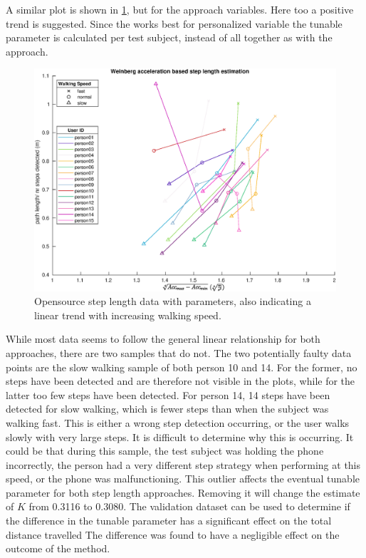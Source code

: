 A similar plot is shown in \cref{fig:step_length_weinberg}, but for the \citet{Weinberg2002} approach variables. Here too a positive trend is suggested. Since the \citet{Weinberg2002} works best for personalized variable the tunable parameter is calculated per test subject, instead of all together as with the \citet{Tian2016} approach. 

\begin{figure}[H]
	\centering
	\includegraphics[width=0.8\linewidth]{images/20201113_1639_weinberg}
	\caption{Opensource step length data with \citet{Weinberg2002} parameters, also indicating a linear trend with increasing walking speed.}
	\label{fig:step_length_weinberg}
\end{figure}

While most data seems to follow the general linear relationship for both approaches, there are two samples that do not. The two potentially faulty data points are the slow walking sample of both person 10 and 14. For the former, no steps have been detected and are therefore not visible in the plots, while for the latter too few steps have been detected. For person 14, 14 steps have been detected for slow walking, which is fewer steps than when the subject was walking fast. This is either a wrong step detection occurring, or the user walks slowly with very large steps. It is difficult to determine why this is occurring. It could be that during this sample, the test subject was holding the phone incorrectly, the person had a very different step strategy when performing at this speed, or the phone was malfunctioning. This outlier affects the eventual tunable parameter for both step length approaches. Removing it will change the estimate of $K$ from 0.3116 to 0.3080. The validation dataset can be used to determine if the difference in the tunable parameter has a significant effect on the total distance travelled The difference was found to have a negligible effect on the outcome of the method.

